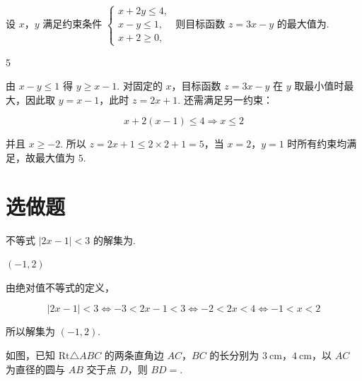 \begin{problem}
设 \(x\)，\(y\) 满足约束条件 \(\begin{cases}
x + 2y \leqslant 4,\\
x - y \leqslant 1,\\
x + 2 \geqslant 0,
\end{cases}\) 则目标函数 \(z = 3x - y\) 的最大值为\fillinblank{}.
\end{problem}

\begin{answer}
5
\end{answer}

\begin{solution}
由 \(x-y\leqslant1\) 得 \(y\geqslant x-1\). 对固定的 \(x\)，目标函数 \(z=3x-y\) 在 \(y\) 取最小值时最大，因此取 \(y=x-1\)，此时 \(z=2x+1\). 还需满足另一约束：

\[
x+2(x-1)\leqslant4\Longrightarrow x\leqslant2
\]

并且 \(x\geqslant-2\). 所以 \(z=2x+1\leqslant2\times2+1=5\)，当 \(x=2\)，\(y=1\) 时所有约束均满足，故最大值为 \(5\).
\end{solution}

\section{选做题}

\begin{problem}[A]
不等式 \(|2x - 1| < 3\) 的解集为\fillinblank{}.
\end{problem}

\begin{answer}
\((-1,2)\)
\end{answer}

\begin{solution}
由绝对值不等式的定义，

\[
|2x-1|<3\Longleftrightarrow-3<2x-1<3
\Longleftrightarrow-2<2x<4
\Longleftrightarrow-1<x<2
\]

所以解集为 \((-1,2)\).
\end{solution}

\reuseproblemnumber
\begin{problem}[B]
如图，已知 \(\mathrm{Rt}\triangle ABC\) 的两条直角边 \(AC\)，\(BC\) 的长分别为 \(3\mathrm{~cm}\)，\(4\mathrm{~cm}\)，以 \(AC\) 为直径的圆与 \(AB\) 交于点 \(D\)，则 \(BD=\)\fillinblank{}.

\end{problem}

